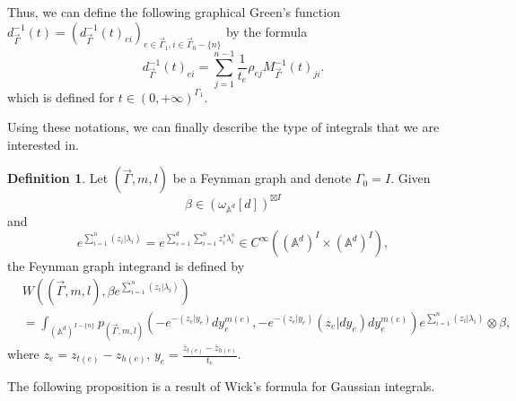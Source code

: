 \documentclass[11pt]{amsart}
\theoremstyle{definition}
\newtheorem{defn}[thm]{Definition}
\theoremstyle{remark}
\numberwithin{equation}{section}
\begin{document}
    Thus, we can define the following graphical Green's function $d^{-1}_{\vec{\Gamma}}(t)=(d^{-1}_{\vec{\Gamma}}(t)
    _{ei})_{e\in\vec{\Gamma}_{1},i\in\vec{\Gamma}_{0}-\{n\}}$ by the formula
    $$
    d^{-1}_{\vec{\Gamma}}(t)_{ei}=\sum_{j=1}^{n-1}\frac{1}{t_{e}}\rho_{ej}M^{-1}_{\vec{\Gamma}}(t)_{ji}.
    $$
    which is defined for $t \in (0,+\infty)^{\Gamma_1}$.


Using these notations, we can finally describe the type of integrals that we are interested in.
\begin{defn}
    Let $(\vec{\Gamma},m,l)$ be a Feynman graph and denote $\Gamma_{0}= I$. Given
    $$
    \beta\in (\omega_{\mathbb{A}^{d}}[d])^{\boxtimes I}
    $$
    and
    $$
    e^{\sum\limits_{i=1}^{n}(z_{i}|\lambda_{i})}=e^{\sum\limits_{s=1}^{d}\sum\limits_{i=1}^{n}z^{s}_{i}\lambda^{s}_{i}}\in C^{\infty}((\mathbb{A}^{d})^{ I}\times (\mathbb{A}^{d})^{ I}),
    $$
    the Feynman graph integrand is defined by
    \begin{align*}
        &W((\vec{\Gamma},m,l),\beta e^{\sum\limits_{i=1}^{n}(z_{i}|\lambda_{i})})\\
        &=
        \int_{(\mathbb{A}^{d})^{ I-\{n\}}}p_{(\vec{\Gamma},m,l)}(-e^{-(z_{e}| y_{e})}dy_{e}^{m(e)},-e^{-(z_{e}| y_{e})}(z_{e}|dy_{e})dy_{e}^{m(e)})e^{\sum\limits_{i=1}^{n}(z_{i}|\lambda_{i})}\otimes \beta,
    \end{align*}
    where $z_{e}=z_{t(e)}-z_{h(e)}$, $y_{e}=\frac{\bar{z}_{t(e)}-\bar{z}_{h(e)}}{t_{e}}$.
\end{defn}

The following proposition is a result of Wick's formula for Gaussian integrals.
\end{document}
